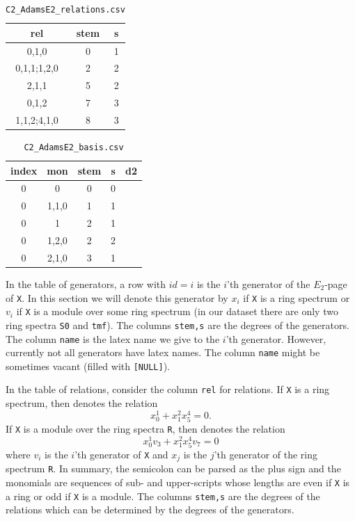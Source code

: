 \documentclass{amsart}
\numberwithin{equation}{section}
\begin{document}
\begin{table}
\begin{tabular}{|c|c|c|}\hline
rel & stem & s\\\hline
0,1,0 & 0 & 1\\\hline
0,1,1;1,2,0 & 2 & 2\\\hline
2,1,1 & 5 & 2\\\hline
0,1,2 & 7 & 3\\\hline
1,1,2;4,1,0 & 8 & 3\\\hline
\end{tabular}
\caption{\texttt{C2\_AdamsE2\_relations.csv}}\label{tb:rel}
\end{table}

\begin{table}
\begin{tabular}{|c|c|c|c|c|}\hline
index & mon & stem & s & d2 \\\hline
0 & 0 & 0 & 0 & \\\hline
0 & 1,1,0 & 1 & 1 & \\\hline
0 & 1 & 2 & 1 & \\\hline
0 & 1,2,0 & 2 & 2 & \\\hline
0 & 2,1,0 & 3 & 1 & \\\hline
\end{tabular}
\caption{\texttt{C2\_AdamsE2\_basis.csv}}\label{tb:basis}
\end{table}

\begin{notation}
    In the table of generators, a row with $id=i$ is the $i$'th generator of the $E_2$-page of \texttt{X}. In this section we will denote this generator by $x_i$ if \texttt{X} is a ring spectrum or $v_i$ if \texttt{X} is a module over some ring spectrum (in our dataset there are only two ring spectra \texttt{S0} and \texttt{tmf}). The columns \texttt{stem,s} are the degrees of the generators. The column \texttt{name} is the latex name we give to the $i$'th generator. However, currently not all generators have latex names. The column \texttt{name} might be sometimes vacant (filled with \verb|[NULL]|).
\end{notation}

\begin{notation}
    In the table of relations, consider the column \verb|rel| for relations. If \verb|X| is a ring spectrum, then  denotes the relation $$x_0^1+x_1^2x_5^4=0.$$
    If \verb|X| is a module over the ring spectra \verb|R|, then  denotes the relation $$x_0^1v_3+x_1^2x_5^4v_7=0$$
    where $v_i$ is the $i$'th generator of \verb|X| and $x_j$ is the $j$'th generator of the ring spectrum \verb|R|.
    In summary, the semicolon can be parsed as the plus sign and the monomials are sequences of sub- and upper-scripts whose lengths are even if \verb|X| is a ring or odd if \verb|X| is a module. The columns \texttt{stem,s} are the degrees of the relations which can be determined by the degrees of the generators.
\end{notation}
\end{document}
